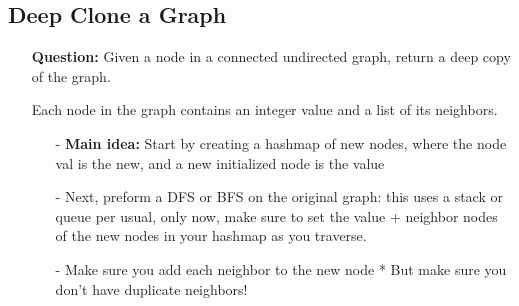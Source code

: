 \documentclass[12pt]{article}
\begin{document}
\subsection{Deep Clone a Graph}
\begin{enumerate}
  \item[] \textbf{Question:} Given a node in a connected undirected graph, return a deep copy of the graph.

Each node in the graph contains an integer value and a list of its neighbors.

    \begin{enumerate}
      \item[-] \textbf{Main idea:} Start by creating a hashmap of new nodes, where the node val is the new, and a new initialized node is the value
      \item[-] Next, preform a DFS or BFS on the original graph: this uses a stack or queue per usual, only now, make sure to set the value + neighbor nodes of the new nodes in your hashmap as you traverse. 
      \item[-] Make sure you add each neighbor to the new node * But make sure you don't have duplicate neighbors!
    \end{enumerate}
\end{enumerate}
\end{document}
